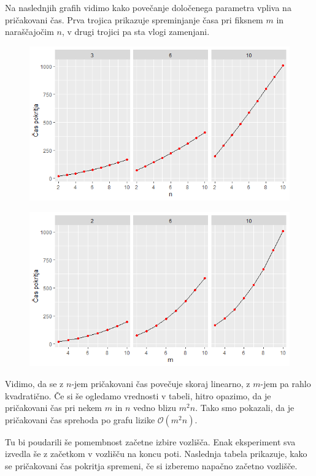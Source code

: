 \documentclass[12pt,a4paper]{amsart}
\begin{document}
Na naslednjih grafih vidimo kako povečanje določenega parametra vpliva na pričakovani čas. Prva trojica prikazuje
spreminjanje časa pri fiksnem $m$ in naraščajočim $n$, v drugi trojici pa sta vlogi zamenjani.

\begin{figure}[h]
    \includegraphics[width=\textwidth]{Rplot.png}
\end{figure}

\begin{figure}[h]
    \includegraphics[width=\textwidth]{fiksenn.png}
\end{figure}

Vidimo, da se z $n$-jem pričakovani čas povečuje skoraj linearno, z $m$-jem pa rahlo kvadratično. Če si še ogledamo
vrednosti v tabeli, hitro opazimo, da je pričakovani čas pri nekem $m$ in $n$ vedno blizu $m^2n$. Tako smo pokazali,
da je pričakovani čas sprehoda po grafu lizike $\mathcal{O}(m^2n)$.

Tu bi poudarili še pomembnost začetne izbire vozlišča. Enak eksperiment sva izvedla še z začetkom v vozlišču na koncu
poti. Naslednja tabela prikazuje, kako se pričakovani čas pokritja spremeni, če si izberemo napačno začetno vozlišče.
\end{document}
